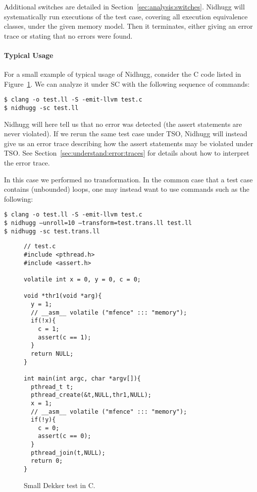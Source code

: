 \documentclass[a4paper]{article}
\begin{document}
\vspace{5pt}\noindent
%
Additional switches are detailed in
Section~\ref{sec:analysis:switches}.
%
Nidhugg will systematically run executions of the test case, covering
all execution equivalence classes, under the given memory model. Then
it terminates, either giving an error trace or stating that no errors
were found.

\paragraph{Typical Usage}
%
For a small example of typical usage of Nidhugg, consider the C code
listed in Figure~\ref{fig:dekker:c}. We can analyze it under SC with
the following sequence of commands:

\vspace{5pt}
\noindent
\texttt{\$ clang -o test.ll -S -emit-llvm test.c}\\
\texttt{\$ nidhugg -sc test.ll}

\vspace{5pt}\noindent
%
Nidhugg will here tell us that no error was detected (the assert
statements are never violated). If we rerun the same test case under
TSO, Nidhugg will instead give us an error trace describing how the
assert statements may be violated under TSO. See
Section~\ref{sec:understand:error:traces} for details about how to
interpret the error trace.

In this case we performed no transformation. In the common case that
a test case contains (unbounded) loops, one may instead
want to use commands such as the following:

\vspace{5pt}
\noindent
\texttt{\$ clang -o test.ll -S -emit-llvm test.c}\\
\texttt{\$ nidhugg --unroll=10 --transform=test.trans.ll test.ll}\\
\texttt{\$ nidhugg -sc test.trans.ll}

\begin{figure}
\begin{verbatim}
// test.c
#include <pthread.h>
#include <assert.h>

volatile int x = 0, y = 0, c = 0;

void *thr1(void *arg){
  y = 1;
  // __asm__ volatile ("mfence" ::: "memory");
  if(!x){
    c = 1;
    assert(c == 1);
  }
  return NULL;
}

int main(int argc, char *argv[]){
  pthread_t t;
  pthread_create(&t,NULL,thr1,NULL);
  x = 1;
  // __asm__ volatile ("mfence" ::: "memory");
  if(!y){
    c = 0;
    assert(c == 0);
  }
  pthread_join(t,NULL);
  return 0;
}
\end{verbatim}
  \caption{Small Dekker test in C.}\label{fig:dekker:c}
\end{figure}
\end{document}
